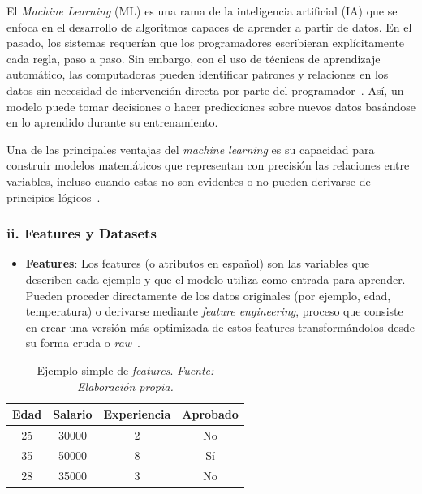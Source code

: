\documentclass[11pt]{article} %
\begin{document}
El \textit{Machine Learning} (ML) es una rama de la inteligencia artificial (IA) que se enfoca en el desarrollo de algoritmos capaces de aprender a partir de datos. En el pasado, los sistemas requerían que los programadores escribieran explícitamente cada regla, paso a paso. Sin embargo, con el uso de técnicas de aprendizaje automático, las computadoras pueden identificar patrones y relaciones en los datos sin necesidad de intervención directa por parte del programador~\cite{sanchez}. Así, un modelo puede tomar decisiones o hacer predicciones sobre nuevos datos basándose en lo aprendido durante su entrenamiento.

Una de las principales ventajas del \textit{machine learning} es su capacidad para construir modelos matemáticos que representan con precisión las relaciones entre variables, incluso cuando estas no son evidentes o no pueden derivarse de principios lógicos~\cite{amazon2024}.




\vspace{8pt}
\subsubsection{ii. Features y Datasets}\vspace{2pt}
\begin{itemize}
\item \textbf{Features}: Los features (o atributos en español) son las variables que describen cada ejemplo y que el modelo utiliza como entrada para aprender. Pueden proceder directamente de los datos originales (por ejemplo, edad, temperatura) o derivarse mediante \textit{feature engineering}, proceso que consiste en crear una versión más optimizada de estos features transformándolos desde su forma cruda o \textit{raw}~\cite{googleML2025}.
\end{itemize}

\begin{table}[h]
\centering
\caption{Ejemplo simple de \textit{features}. \textit{Fuente: Elaboración propia.}}

\label{tab:simple_features}
\begin{tabular}{|c|c|c|c|}
\hline
\textbf{Edad} & \textbf{Salario} & \textbf{Experiencia} & \textbf{Aprobado} \\
\hline
25 & 30000 & 2 & No \\
\hline
35 & 50000 & 8 & Sí \\
\hline
28 & 35000 & 3 & No \\
\hline
\end{tabular}
\end{table}
\end{document}
